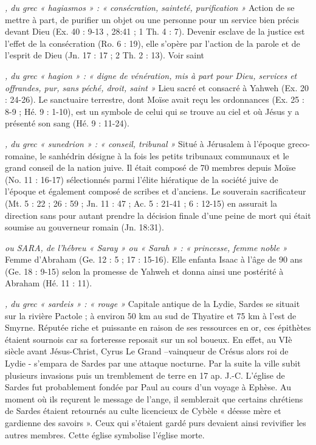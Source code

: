 \begin{multicols}{2}
\textit{, du grec « hagiasmos » : « consécration, sainteté, purification »}\newline
Action de se mettre à part, de purifier un objet ou une personne pour un service bien précis devant Dieu (Ex. 40 : 9-13 , 28:41 ; 1 Th. 4 : 7). Devenir esclave de la justice est l'effet de la consécration (Ro. 6 : 19), elle s'opère par l'action de la parole et de l'esprit de Dieu (Jn. 17 : 17 ; 2 Th. 2 : 13). Voir saint

\textit{, du grec « hagion » : « digne de vénération, mis à part pour Dieu, services et offrandes, pur, sans péché, droit, saint »}\newline
Lieu sacré et consacré à Yahweh (Ex. 20 : 24-26). Le sanctuaire terrestre, dont Moïse avait reçu les ordonnances (Ex. 25 : 8-9 ; Hé. 9 : 1-10), est un symbole de celui qui se trouve au ciel et où Jésus y a présenté son sang (Hé. 9 : 11-24).

\textit{, du grec « sunedrion » : « conseil, tribunal »}\newline
Situé à Jérusalem à l'époque greco-romaine, le sanhédrin désigne à la fois les petits tribunaux communaux et le grand conseil de la nation juive. Il était composé de 70 membres depuis Moïse (No. 11 : 16-17) sélectionnés parmi l'élite hiératique de la société juive de l'époque et également composé de scribes et d'anciens. Le souverain sacrificateur (Mt. 5 : 22 ; 26 : 59 ; Jn. 11 : 47 ; Ac. 5 : 21-41 ; 6 : 12-15) en assurait la direction sans pour autant prendre la décision finale d'une peine de mort qui était soumise au gouverneur romain (Jn. 18:31).

\textit{ou SARA, de l'hébreu « Saray » ou « Sarah » : « princesse, femme noble »}\newline
Femme d'Abraham (Ge. 12 : 5 ; 17 : 15-16). Elle enfanta Isaac à l'âge de 90 ans (Ge. 18 : 9-15) selon la promesse de Yahweh et donna ainsi une postérité à Abraham (Hé. 11 : 11).

\textit{, du grec « sardeis » : « rouge »}\newline
Capitale antique de la Lydie, Sardes se situait sur la rivière Pactole ; à environ 50 km au sud de Thyatire et 75 km à l’est de Smyrne. Réputée riche et puissante en raison de ses ressources en or, ces épithètes étaient sournois car sa forteresse reposait sur un sol boueux. En effet, au VIè siècle avant Jésus-Christ, Cyrus Le Grand –vainqueur de Crésus alors roi de Lydie - s’empara de Sardes par une attaque nocturne. Par la suite la ville subit plusieurs invasions puis un tremblement de terre en 17 ap. J.-C.
L’église de Sardes fut probablement fondée par Paul au cours d’un voyage à Ephèse. Au moment où ils reçurent le message de l’ange, il semblerait que certains chrétiens de Sardes étaient retournés au culte licencieux de Cybèle « déesse mère et gardienne des savoirs ». Ceux qui s’étaient gardé purs devaient ainsi revivifier les autres membres. Cette église symbolise l’église morte.


\end{multicols}
